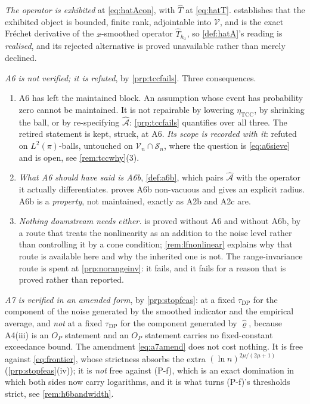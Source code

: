 \begin{remark}\label{rem:tccverdict}
\emph{The operator is exhibited} at \eqref{eq:hatAcon}, with $\hat T$ at \eqref{eq:hatT}.
 establishes that the exhibited object is bounded, finite rank,
adjointable into $\mathcal V$, and is the exact Fr\'echet derivative of the $x$-smoothed operator
$\hat T_{h_x}$, so \cref{def:hatA}'s reading is \emph{realised}, and its rejected
alternative is proved unavailable rather than merely declined.

\emph{A6 is not verified; it is refuted}, by \cref{prp:tccfails}. Three consequences.
\begin{enumerate}
\item[(1)] A6 has left the maintained block. An assumption whose event has probability zero
cannot be maintained. It is not repairable by lowering $\eta_{\mathrm{TCC}}$, by shrinking the ball, or
by re-specifying $\hat{\mathcal A}$: \cref{prp:tccfails} quantifies over all three. The retired
statement is kept, struck, at A6. \emph{Its scope is recorded with it}: refuted on
$L^{2}(\pi)$-balls, untouched on $\mathcal V_n\cap\mathcal S_n$, where the question is
\eqref{eq:a6sieve} and is open, see \cref{rem:tccwhy}(3).
\item[(2)] \emph{What A6 should have said is A6b}, \cref{def:a6b}, which pairs $\hat{\mathcal A}$ with
the operator it actually differentiates.  proves A6b non-vacuous and gives an
explicit radius. A6b is a \emph{property}, not maintained, exactly as A2b and A2c are.
\item[(3)] \emph{Nothing downstream needs either.}  is proved without A6 and without
A6b, by a route that treats the
nonlinearity as an addition to the noise level rather than controlling it by a cone condition;
\cref{rem:lfnonlinear} explains why that route is available here and why the inherited one is not. The
range-invariance route is spent at \cref{prp:norangeinv}: it fails, and it fails for a reason that is
proved rather than reported.
\end{enumerate}

\emph{A7 is verified in an amended form}, by \cref{prp:stopfeas}: at a fixed $\tau_{\mathrm{DP}}$ for the
component of the noise generated by the smoothed indicator and the empirical average, and \emph{not} at
a fixed $\tau_{\mathrm{DP}}$ for the component generated by $\hat\varrho$, because A4(iii) is an $O_P$
statement and an $O_P$ statement carries no fixed-constant exceedance bound. The amendment
\eqref{eq:a7amend} does not cost nothing. It is free
against \eqref{eq:frontier}, whose strictness absorbs the extra $(\ln n)^{2\mu/(2\mu+1)}$
(\cref{prp:stopfeas}(iv)); it is \emph{not} free against (P-f), which is an exact domination in which
both sides now carry logarithms, and it is what turns (P-f)'s thresholds strict, 
see \cref{rem:h6bandwidth}.
\end{remark}

